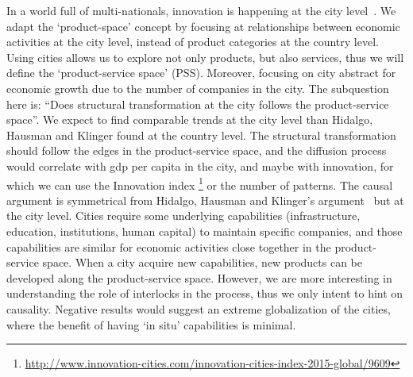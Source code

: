 In a world full of multi-nationals, innovation is happening at the city level~\citep{Belderbos2014}.
We adapt the `product-space' concept by focusing at relationships between economic activities at the city level,
instead of product categories at the country level.
Using cities allows us to explore not only products, but also services, thus we will define the `product-service space' (PSS). 
Moreover, focusing on city abstract for economic growth due to the number of companies in the city.
The subquestion here is: ``Does structural transformation at the city follows the product-service space''.
We expect to find comparable trends at the city level than Hidalgo, Hausman and Klinger found at the country level.
The structural transformation should follow the edges in the product-service space, 
and the diffusion process would correlate with gdp per capita in the city, 
and maybe with innovation, for which we can use the Innovation index \footnote{\url{http://www.innovation-cities.com/innovation-cities-index-2015-global/9609}}
or the number of patterns.
The causal argument is symmetrical from Hidalgo, Hausman and Klinger's argument~\cite{hidalgo2007, hausmann2011, Hausmann2006,hidalgo2009} but at the city level.
Cities require some underlying capabilities (infrastructure, education, institutions, human capital) to maintain specific companies,
and those capabilities are similar for economic activities close together in the product-service space.
When a city acquire new capabilities, new products can be developed along the product-service space.
However, we are more interesting in understanding the role of interlocks in the process, 
thus we only intent to hint on causality.
Negative results would suggest an extreme globalization of the cities, 
where the benefit of having `in situ' capabilities is minimal.




